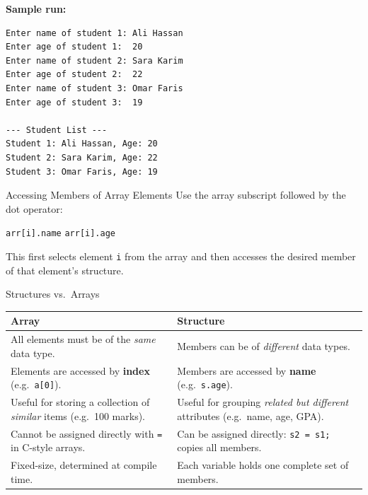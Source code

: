 \noindent
\textbf{Sample run:}
\begin{verbatim}
Enter name of student 1: Ali Hassan
Enter age of student 1:  20
Enter name of student 2: Sara Karim
Enter age of student 2:  22
Enter name of student 3: Omar Faris
Enter age of student 3:  19

--- Student List ---
Student 1: Ali Hassan, Age: 20
Student 2: Sara Karim, Age: 22
Student 3: Omar Faris, Age: 19
\end{verbatim}

\begin{infobox}{Accessing Members of Array Elements}
Use the array subscript followed by the dot operator:

\medskip
\texttt{arr[i].name} \qquad \texttt{arr[i].age}
\medskip

This first selects element \texttt{i} from the array and then
accesses the desired member of that element's structure.
\end{infobox}

\begin{conceptbox}{Structures vs.\ Arrays}
\renewcommand{\arraystretch}{1.3}
\begin{tabular}{@{} p{6.5cm} p{6.5cm} @{}}
\toprule
\textbf{Array} & \textbf{Structure} \\
\midrule
All elements must be of the \emph{same} data type.
    & Members can be of \emph{different} data types. \\
Elements are accessed by \textbf{index} (e.g.\ \texttt{a[0]}).
    & Members are accessed by \textbf{name} (e.g.\ \texttt{s.age}). \\
Useful for storing a collection of \emph{similar} items (e.g.\ 100
    marks). & Useful for grouping \emph{related but different}
    attributes (e.g.\ name, age, GPA). \\
Cannot be assigned directly with \texttt{=} in C-style arrays.
    & Can be assigned directly: \texttt{s2 = s1;} copies all members. \\
Fixed-size, determined at compile time.
    & Each variable holds one complete set of members. \\
\bottomrule
\end{tabular}
\end{conceptbox}

